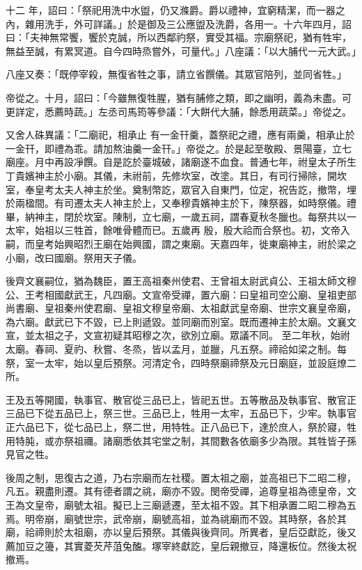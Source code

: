 \begin{pinyinscope}
 十二
 年，詔曰：「祭祀用洗中水盥，仍又滌爵。爵以禮神，宜窮精潔，而一器之內，雜用洗手，外可詳議。」於是御及三公應盥及洗爵，各用一。十六年四月，詔曰：「夫神無常饗，饗於克誠，所以西鄰礿祭，實受其福。宗廟祭祀，猶有牲牢，無益至誠，有累冥道。自今四時烝嘗外，可量代。」八座議：「以大脯代一元大武。」



 八座又奏：「既停宰殺，無復省牲之事，請立省饌儀。其眾官陪列，並同省牲。」



 帝從之。十月，詔曰：「今雖無復牲腥，猶有脯修之類，即之幽明，義為未盡。可更詳定，悉薦時蔬。」左丞司馬筠等參議：「大餅代大脯，餘悉用蔬菜。」帝從之。



 又舍人硃異議：「二廟祀，相承止
 有一金幵羹，蓋祭祀之禮，應有兩羹，相承止於一金幵，即禮為乖。請加熬油羹一金幵。」帝從之。於是起至敬殿、景陽臺，立七廟座。月中再設凈饌。自是訖於臺城破，諸廟遂不血食。普通七年，祔皇太子所生丁貴嬪神主於小廟。其儀，未祔前，先修坎室，改塗。其日，有司行掃除，開坎室，奉皇考太夫人神主於坐。奠制幣訖，眾官入自東門，位定，祝告訖，撤幣，埋於兩楹間。有司遷太夫人神主於上，又奉穆貴嬪神主於下，陳祭器，如時祭儀。禮畢，納神主，閉於坎室。陳制，立七廟，一歲五祠，謂春夏秋冬臘也。每祭共以一太牢，始祖以三牲首，餘唯骨體而已。五歲再
 殷，殷大祫而合祭也。初，文帝入嗣，而皇考始興昭烈王廟在始興國，謂之東廟。天嘉四年，徙東廟神主，祔於梁之小廟，改曰國廟。祭用天子儀。



 後齊文襄嗣位，猶為魏臣，置王高祖秦州使君、王曾祖太尉武貞公、王祖太師文穆公、王考相國獻武王，凡四廟。文宣帝受禪，置六廟：曰皇祖司空公廟、皇祖吏部尚書廟、皇祖秦州使君廟、皇祖文穆皇帝廟、太祖獻武皇帝廟、世宗文襄皇帝廟，為六廟。獻武已下不毀，已上則遞毀。並同廟而別室。既而遷神主於太廟。文襄文宣，並太祖之子，文宣初疑其昭穆之次，欲別立廟。眾議不同。
 至二年秋，始祔太廟。春祠、夏礿、秋嘗、冬烝，皆以孟月，並臘，凡五祭。禘祫如梁之制。每祭，室一太牢，始以皇后預祭。河清定令，四時祭廟禘祭及元日廟庭，並設庭燎二所。



 王及五等開國，執事官、散官從三品已上，皆祀五世。五等散品及執事官、散官正三品已下從五品已上，祭三世。三品已上，牲用一太牢，五品已下，少牢。執事官正六品已下，從七品已上，祭二世，用特牲。正八品已下，達於庶人，祭於寢，牲用特肫，或亦祭祖禰。諸廟悉依其宅堂之制，其間數各依廟多少為限。其牲皆子孫見官之牲。



 後周之制，思復古之道，乃右宗廟而左社稷。置太祖之廟，並高祖已下二昭二穆，凡五。親盡則遷。其有德者謂之祧，廟亦不毀。閔帝受禪，追尊皇祖為德皇帝，文王為文皇帝，廟號太祖。擬已上三廟遞遷，至太祖不毀。其下相承置二昭二穆為五焉。明帝崩，廟號世宗，武帝崩，廟號高祖，並為祧廟而不毀。其時祭，各於其廟，祫禘則於太祖廟，亦以皇后預祭。其儀與後齊同。所異者，皇后亞獻訖，後又薦加豆之籩，其實菱芡芹菹兔醢。塚宰終獻訖，皇后親撤豆，降還板位。然後太祝撤焉。




\end{pinyinscope}
